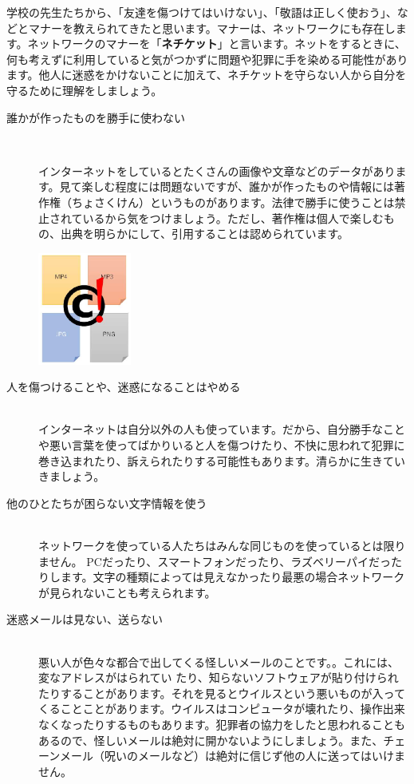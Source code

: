 \documentclass[a4paper,12pt,dvipdfmx]{jarticle}
\begin{document}

学校の先生たちから、「友達を傷つけてはいけない」、「敬語は正しく使おう」、などとマナーを教えられてきたと思います。マナーは、ネットワークにも存在します。ネットワークのマナーを「\textbf{ネチケット}」と言います。ネットをするときに、何も考えずに利用していると気がつかずに問題や犯罪に手を染める可能性があります。他人に迷惑をかけないことに加えて、ネチケットを守らない人から自分を守るために理解をしましょう。



\begin{description}

	\item[誰かが作ったものを勝手に使わない]~\\
		\begin{minipage}[b]{0.6\textwidth}
インターネットをしているとたくさんの画像や文章などのデータがあります。見て楽しむ程度には問題ないですが、誰かが作ったものや情報には著作権（ちょさくけん）というものがあります。法律で勝手に使うことは禁止されているから気をつけましょう。ただし、著作権は個人で楽しむもの、出典を明らかにして、引用することは認められています。
		\end{minipage}\hfill
\includegraphics[width=0.25\textwidth,height=0.20\textwidth]{ome7-img001}
\item[人を傷つけることや、迷惑になることはやめる]~\\
		インターネットは自分以外の人も使っています。だから、自分勝手なことや悪い言葉を使ってばかりいると人を傷つけたり、不快に思われて犯罪に巻き込まれたり、訴えられたりする可能性もあります。清らかに生きていきましょう。
\item[他のひとたちが困らない文字情報を使う]~\\
ネットワークを使っている人たちはみんな同じものを使っているとは限りません。
PCだったり、スマートフォンだったり、ラズベリーパイだったりします。文字の種類によっては見えなかったり最悪の場合ネットワークが見られないことも考えられます。
\item[迷惑メールは見ない、送らない]~\\
悪い人が色々な都合で出してくる怪しいメールのことです。。これには、変なアドレスがはられてい
たり、知らないソフトウェアが貼り付けられたりすることがあります。それを見るとウイルスという悪いものが入ってくることことがあります。ウイルスはコンピュータが壊れたり、操作出来なくなったりするものもあります。犯罪者の協力をしたと思われることもあるので、怪しいメールは絶対に開かないようにしましょう。また、チェーンメール（呪いのメールなど）は絶対に信じず他の人に送ってはいけません。

\end{description}
\end{document}
